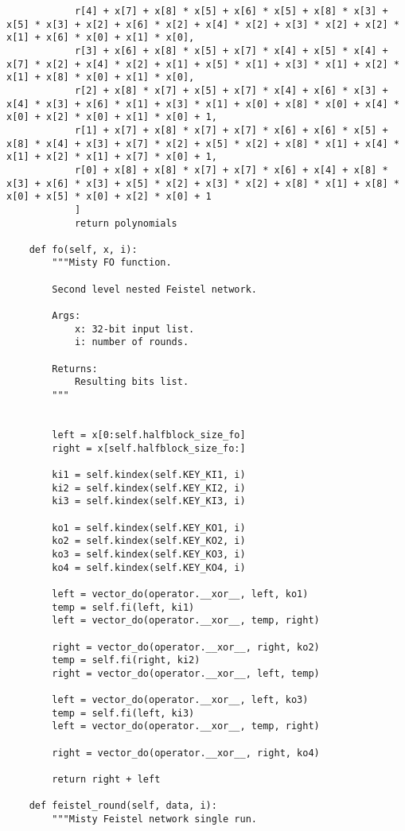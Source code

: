 \begin{lstlisting}
            r[4] + x[7] + x[8] * x[5] + x[6] * x[5] + x[8] * x[3] + x[5] * x[3] + x[2] + x[6] * x[2] + x[4] * x[2] + x[3] * x[2] + x[2] * x[1] + x[6] * x[0] + x[1] * x[0],
            r[3] + x[6] + x[8] * x[5] + x[7] * x[4] + x[5] * x[4] + x[7] * x[2] + x[4] * x[2] + x[1] + x[5] * x[1] + x[3] * x[1] + x[2] * x[1] + x[8] * x[0] + x[1] * x[0],
            r[2] + x[8] * x[7] + x[5] + x[7] * x[4] + x[6] * x[3] + x[4] * x[3] + x[6] * x[1] + x[3] * x[1] + x[0] + x[8] * x[0] + x[4] * x[0] + x[2] * x[0] + x[1] * x[0] + 1,
            r[1] + x[7] + x[8] * x[7] + x[7] * x[6] + x[6] * x[5] + x[8] * x[4] + x[3] + x[7] * x[2] + x[5] * x[2] + x[8] * x[1] + x[4] * x[1] + x[2] * x[1] + x[7] * x[0] + 1,
            r[0] + x[8] + x[8] * x[7] + x[7] * x[6] + x[4] + x[8] * x[3] + x[6] * x[3] + x[5] * x[2] + x[3] * x[2] + x[8] * x[1] + x[8] * x[0] + x[5] * x[0] + x[2] * x[0] + 1
            ]
            return polynomials

    def fo(self, x, i):
        """Misty FO function.

        Second level nested Feistel network.

        Args:
            x: 32-bit input list.
            i: number of rounds.

        Returns:
            Resulting bits list.
        """


        left = x[0:self.halfblock_size_fo]
        right = x[self.halfblock_size_fo:]

        ki1 = self.kindex(self.KEY_KI1, i)
        ki2 = self.kindex(self.KEY_KI2, i)
        ki3 = self.kindex(self.KEY_KI3, i)

        ko1 = self.kindex(self.KEY_KO1, i)
        ko2 = self.kindex(self.KEY_KO2, i)
        ko3 = self.kindex(self.KEY_KO3, i)
        ko4 = self.kindex(self.KEY_KO4, i)

        left = vector_do(operator.__xor__, left, ko1)
        temp = self.fi(left, ki1)
        left = vector_do(operator.__xor__, temp, right)

        right = vector_do(operator.__xor__, right, ko2)
        temp = self.fi(right, ki2)
        right = vector_do(operator.__xor__, left, temp)

        left = vector_do(operator.__xor__, left, ko3)
        temp = self.fi(left, ki3)
        left = vector_do(operator.__xor__, temp, right)

        right = vector_do(operator.__xor__, right, ko4)

        return right + left

    def feistel_round(self, data, i):
        """Misty Feistel network single run.


\end{lstlisting}
